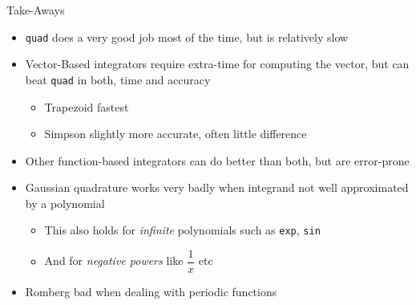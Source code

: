 \begin{frame}{Take-Aways}
%
\begin{itemize}
\item \texttt{quad} does a very good job most of the time, but is relatively slow
\item Vector-Based integrators require extra-time for computing the vector, but can beat \texttt{quad} in both, time and accuracy
	\begin{itemize}
	\item Trapezoid fastest
	\item Simpson slightly more accurate, often little difference
	\end{itemize}
\item Other function-based integrators can do better than both, but are error-prone
\item Gaussian quadrature works very badly when integrand not well approximated by a polynomial
	\begin{itemize}
	\item This also holds for \emph{infinite} polynomials such as \texttt{exp}, \texttt{sin}
	\item And for \emph{negative powers} like $\dfrac{1}{x}$ etc
	\end{itemize}
\item Romberg bad when dealing with periodic functions
\end{itemize}
%
\end{frame}
